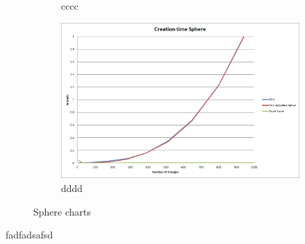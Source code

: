 \documentclass[11pt,twoside,a4paper]{report}
\begin{document}
\begin{figure}[h]
\begin{subfigure}[h]{0.49\textwidth}
	\caption{cccc} \label{fig:gull} \end{subfigure}
    \begin{subfigure}[h]{0.49\textwidth}
	\includegraphics[width=\textwidth]{images/chart_sphere_creation_time}
    \caption{dddd} \label{fig:tiger} \end{subfigure}
    \caption{Sphere charts}\label{fig:animals}
\end{figure}

fadfadsafsd
\end{document}
